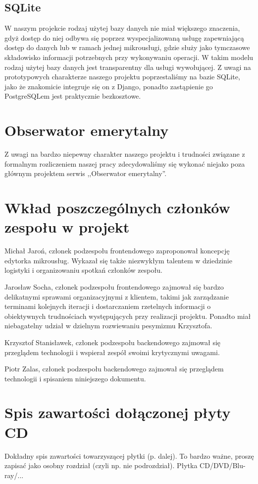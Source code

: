 \documentclass[licencjacka]{pracamgr}
\begin{document}
\section{SQLite}

W naszym projekcie rodzaj użytej bazy danych nie miał większego znaczenia, gdyż dostęp do niej odbywa się poprzez
wyspecjalizowaną usługę zapewniającą dostęp do danych lub w ramach jednej mikrousługi, gdzie służy jako tymczasowe
składowisko informacji potrzebnych przy wykonywaniu operacji. W takim modelu rodzaj użytej bazy danych jest
transparentny dla usługi wywołującej. Z uwagi na prototypowych charakterze naszego projektu poprzestaliśmy na
bazie SQLite, jako że znakomicie integruje się on z Django, ponadto zastąpienie go PostgreSQLem jest praktycznie bezkosztowe.

\chapter{Obserwator emerytalny}
Z uwagi na bardzo niepewny charakter naszego projektu i trudności związane z
formalnym rozliczeniem naszej pracy zdecydowaliśmy się wykonać niejako poza
głównym projektem serwis ,,Obserwator emerytalny''.

\chapter{Wkład poszczególnych członków zespołu w projekt}\label{r:wklad}
Michał Jaroń, członek podzespołu frontendowego zaproponował koncepcję edytorka
mikrousług. Wykazał się także niezwykłym talentem w dziedzinie logistyki i
organizowaniu spotkań członków zespołu.

Jarosław Socha, członek podzespołu frontendowego zajmował się bardzo delikatnymi
sprawami organizacyjnymi z klientem, takimi jak zarządzanie terminami kolejnych
iteracji i dostarczaniem rzetelnych informacji o obiektywnych  trudnościach
występujących przy realizacji projektu. Ponadto miał niebagatelny udział w
dzielnym rozwiewaniu pesymizmu Krzysztofa.

Krzysztof Stanisławek, członek podzespołu backendowego zajmował się przeglądem
technologii i wspierał zespół swoimi krytycznymi uwagami.

Piotr Zalas, członek podzespołu backendowego zajmował się przeglądem technologii
i spisaniem niniejszego dokumentu.

\appendix
\chapter{Spis zawartości dołączonej płyty CD}\label{r:spis}
Dokładny spis zawartości towarzyszącej płytki (p. dalej). To bardzo ważne, proszę zapisać jako osobny rozdział (czyli np. nie podrozdział). Płytka CD/DVD/Blu-ray/...
\end{document}
